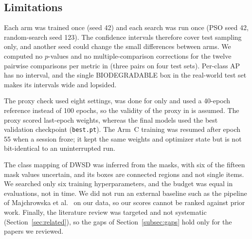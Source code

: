 \subsection{Limitations}
\label{subsec:limitations}

Each arm was trained once (seed 42) and each search was run once (PSO seed 42, random-search seed 123). The confidence intervals therefore cover test sampling only, and another seed could change the small differences between arms. We computed no $p$-values and no multiple-comparison corrections for the twelve pairwise comparisons per metric in \gentwo (three pairs on four test sets). Per-class AP has no interval, and the single BIODEGRADABLE box in the real-world test set makes its intervals wide and lopsided.

The proxy check used eight settings, was done for \genone only and used a 40-epoch reference instead of 100 epochs, so the validity of the proxy in \gentwo is assumed. The proxy scored last-epoch weights, whereas the final models used the best validation checkpoint (\texttt{best.pt}). The \gentwo Arm~C training was resumed after epoch 55 when a session froze; it kept the same weights and optimizer state but is not bit-identical to an uninterrupted run.

The class mapping of DWSD was inferred from the masks, with six of the fifteen mask values uncertain, and its boxes are connected regions and not single items. We searched only six training hyperparameters, and the budget was equal in evaluations, not in time. We did not run an external baseline such as the pipeline of Majchrowska et al.~\cite{majchrowska2022deep} on our data, so our scores cannot be ranked against prior work. Finally, the literature review was targeted and not systematic (Section~\ref{sec:related}), so the gaps of Section~\ref{subsec:gaps} hold only for the papers we reviewed.
